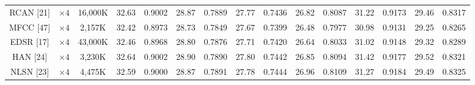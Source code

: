\documentclass[twocolumn]{svjour3}          %
\begin{document}
\begin{table}
\begin{tabular}{|c|c|c|cc|cc|cc|cc|cc|cc|}
RCAN [21]& $\times4$ &16,000K & \multicolumn{1}{c|}{32.63} &0.9002 & \multicolumn{1}{c|}{28.87} & 0.7889&\multicolumn{1}{c|}{27.77} &0.7436 & \multicolumn{1}{c|}{26.82} &0.8087 & \multicolumn{1}{c|}{31.22 } & 0.9173
&\multicolumn{1}{c|}{29.46} &0.8317 \\


MFCC [47]& $\times 4$&2,157K& \multicolumn{1}{c|}{32.42} & 0.8973 & \multicolumn{1}{c|}{28.73} &0.7849 &\multicolumn{1}{c|}{27.67} & 0.7399 & \multicolumn{1}{c|}{26.48} &0.7977 & \multicolumn{1}{c|}{30.98} & 0.9131
&\multicolumn{1}{c|}{29.25} & 0.8265\\



EDSR [17] & $\times4$ &43,000K& \multicolumn{1}{c|}{32.46} &0.8968& \multicolumn{1}{c|}{28.80} &0.7876 &\multicolumn{1}{c|}{27.71} &0.7420 & \multicolumn{1}{c|}{26.64 } & 0.8033 & \multicolumn{1}{c|}{31.02} & 0.9148
&\multicolumn{1}{c|}{29.32} &0.8289  \\

HAN [24] & $\times4$ &3,230K& \multicolumn{1}{c|}{32.64 } &0.9002 & \multicolumn{1}{c|}{28.90} &0.7890 &\multicolumn{1}{c|}{27.80} &0.7442& \multicolumn{1}{c|}{26.85} &0.8094 & \multicolumn{1}{c|}{31.42} &0.9177
&\multicolumn{1}{c|}{29.52} &0.8321 \\

NLSN [23] & $\times4$ &4,475K& \multicolumn{1}{c|}{32.59 } &0.9000 & \multicolumn{1}{c|}{28.87} &0.7891 &\multicolumn{1}{c|}{27.78} &0.7444 & \multicolumn{1}{c|}{26.96} &0.8109 & \multicolumn{1}{c|}{31.27} &0.9184
&\multicolumn{1}{c|}{29.49} &0.8325 \\


\end{tabular}
\end{table}
\end{document}
